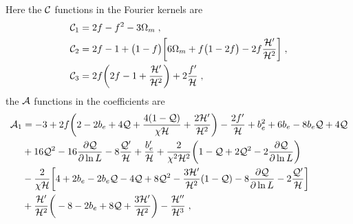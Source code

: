 \endgroup

\noindent Here the ${\cal C}$ functions in the Fourier kernels are
\begin{align}
{\mathcal{C}_{1}} &= 2f - f^2 -3\Omega_m\;, \label{e7} \\
\mathcal{C}_{2} &= 2f-1+ \big(1-f\big)\bigg[6\Omega_m + f\big(1-2f\big) - 2f\frac{\mathcal{H}'}{\mathcal{H}^{2}}\bigg] \;, \label{e10} \\
\mathcal{C}_{3} &= 2 f\bigg(2f-1+\frac{\mathcal{H}'}{\mathcal{H}^{2}}\bigg) +2 \frac{f'}{\mathcal{H}}\;, \label{e12} 
\end{align}
the 
${\cal A}$ functions in the coefficients are 
\begin{align}
\mathcal{A}_{1} &= {-3} +2f\bigg({2}-2b_{e}+{4}\mathcal{Q}+\frac{4(1-\mathcal{Q})}{\chi\mathcal{H}} +\frac{2\mathcal{H}'}{\mathcal{H}^{2}}\bigg) -\frac{2f'}{\mathcal{H}} +b_{e}^{2}+ 6b_{e}-8b_{e}\mathcal{Q}+4\mathcal{Q} \nonumber \\
& +16\mathcal{Q}^{2} -16\frac{\partial \mathcal{Q}}{\partial \ln{L}} -8\frac{\mathcal{Q}'}{\mathcal{H}} + \frac{b_{e}'}{\mathcal{H}}+\frac{2}{\chi^{2}\mathcal{H}^{2}}\bigg(1-\mathcal{Q}+2\mathcal{Q}^{2}-2\frac{\partial \mathcal{Q}}{\partial \ln{{L}}}\bigg)  \nonumber\\ 
& - \frac{2}{\chi\mathcal{H}}\bigg[4+2b_{e}-2b_{e}\mathcal{Q}-4\mathcal{Q}+8\mathcal{Q}^{2}-\frac{3\mathcal{H}'}{\mathcal{H}^{2}}(1-\mathcal{Q})- 8\frac{\partial \mathcal{Q}}{\partial \ln{{L}}} - 2\frac{\mathcal{Q}'}{\mathcal{H}}\bigg] \nonumber \\
& + \frac{\mathcal{H}'}{\mathcal{H}^{2}}\bigg(-8-2b_{e}+{8}\mathcal{Q}+\frac{3\mathcal{H}'}{\mathcal{H}^{2}}\bigg) - \frac{\mathcal{H}''}{\mathcal{H}^{3}}\;, \label{e2} 
\end{align}
